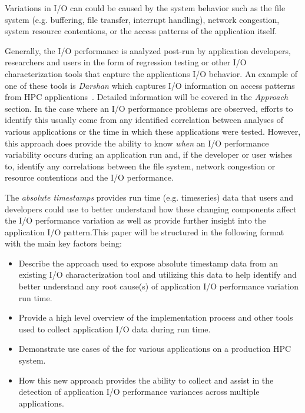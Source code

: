 \documentclass[conference]{IEEEtran}
\begin{document}
Variations in I/O can could be caused by the system behavior such as the file system (e.g. buffering, file transfer, interrupt handling), network congestion, system resource contentions, or the access patterns of the application itself.

Generally, the I/O performance is analyzed post-run by application developers, researchers and users in the form of regression testing or other I/O characterization tools that capture the applications I/O behavior. An example of one of these tools is \emph{Darshan} which captures I/O information on access patterns from HPC applications~\cite{Darshan}. Detailed information will be covered in the \emph{Approach} section. In the case where an I/O performance problems are observed, efforts to identify this usually come from any identified correlation between analyses of various applications or the time in which these applications were tested. However, this approach does provide the ability to know \emph{when} an I/O performance variability occurs during an application run and, if the developer or user wishes to, identify any correlations between the file system, network congestion or resource contentions and the I/O performance.


The \emph{absolute timestamps} provides run time (e.g. timeseries) data that users and developers could use to better understand how these changing components affect the I/O performance variation as well as provide further insight into the application I/O pattern.This paper will be structured in the following format with the main key factors being:
\begin{itemize}
    \item Describe the approach used to expose absolute timestamp data from an existing I/O characterization tool and utilizing this data to help identify and better understand any root cause(s) of application I/O performance variation run time.
    \item Provide a high level overview of the implementation process and other tools used to collect application I/O data during run time.
    \item Demonstrate use cases of the \connector for various applications on a production HPC system. 
    \item How this new approach provides the ability to collect and assist in the detection of application I/O performance variances across multiple applications. 
\end{itemize}
\end{document}
